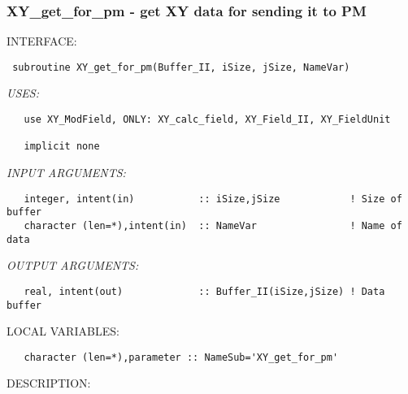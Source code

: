  
\parskip        0pt
\parindent      0pt
\baselineskip  11pt
 
\def\bv{\begin{verbatim}}
\def\ev{\end{verbatim}}
\def\be{\begin{equation}}
\def\ee{\end{equation}}
\def\bea{\begin{eqnarray}}
\def\eea{\end{eqnarray}}
\def\bi{\begin{itemize}}
\def\ei{\end{itemize}}
\def\bn{\begin{enumerate}}
\def\en{\end{enumerate}}
\def\bd{\begin{description}}
\def\ed{\end{description}}
\def\({\left (}
\def\){\right )}
\def\[{\left [}
\def\]{\right ]}
\def\<{\left  \langle}
\def\>{\right \rangle}
\def\cI{{\cal I}}
\def\diag{\mathop{\rm diag}}
\def\tr{\mathop{\rm tr}}
 
\newpage


\subsubsection{ XY\_get\_for\_pm - get XY data for sending it to PM }


\bigskip
{\sf INTERFACE:}
\begin{verbatim} subroutine XY_get_for_pm(Buffer_II, iSize, jSize, NameVar)
 \end{verbatim}
{\em USES:}
\begin{verbatim}   use XY_ModField, ONLY: XY_calc_field, XY_Field_II, XY_FieldUnit
 
   implicit none
 \end{verbatim}
{\em INPUT ARGUMENTS:}
\begin{verbatim}   integer, intent(in)           :: iSize,jSize            ! Size of buffer
   character (len=*),intent(in)  :: NameVar                ! Name of data
 \end{verbatim}
{\em OUTPUT ARGUMENTS:}
\begin{verbatim}   real, intent(out)             :: Buffer_II(iSize,jSize) ! Data buffer
 \end{verbatim}
{\sf LOCAL VARIABLES:}
\begin{verbatim}   character (len=*),parameter :: NameSub='XY_get_for_pm'
 \end{verbatim}
{\sf DESCRIPTION:}\\
 
